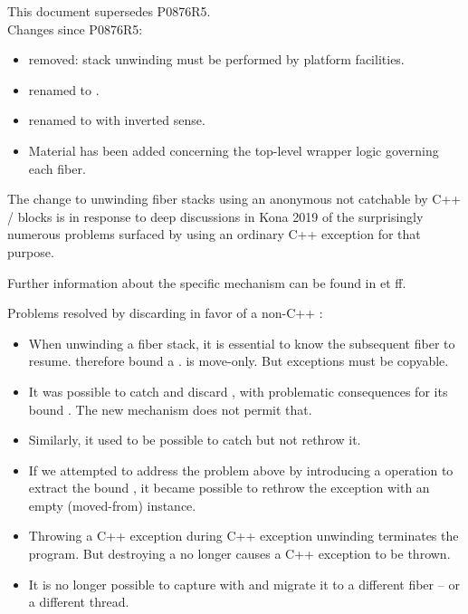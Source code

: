 \label{history}
This document supersedes P0876R5.\\
\newline
Changes since P0876R5:

\begin{itemize}
    \item {} removed: stack unwinding must be
      performed by platform facilities.
    \item {} renamed to
      \canxtresume.
    \item {} renamed to  with inverted
      sense.
    \item Material has been added concerning the top-level wrapper
      logic governing each fiber.
\end{itemize}

The change to unwinding fiber stacks using an anonymous \foreignex not
catchable by C++  /  blocks is in response to deep
discussions in Kona 2019 of the surprisingly numerous problems surfaced by
using an ordinary C++ exception for that purpose.

Further information about the specific mechanism can be found in
 et ff.

Problems resolved by discarding \unwindex in favor of a non-C++ \foreignex:
\begin{itemize}
    \item When unwinding a fiber stack, it is essential to know the subsequent
          fiber to resume. \unwindex therefore bound a \fiber. \fiber is
          move-only. But exceptions must be copyable.
    \item It was possible to catch and discard \unwindex, with problematic
          consequences for its bound \fiber. The new mechanism does not permit
          that.
    \item Similarly, it used to be possible to catch \unwindex but not rethrow it.
    \item If we attempted to address the problem above by introducing a
          \unwindex operation to extract the bound \fiber, it became possible
          to rethrow the exception with an empty (moved-from) \fiber instance.
    \item Throwing a C++ exception during C++ exception unwinding terminates
          the program. But destroying a \fiber no longer causes a C++
          exception to be thrown.
    \item It is no longer possible to capture \unwindex with
           and migrate it to a different fiber -- or
          a different thread.
\end{itemize}

